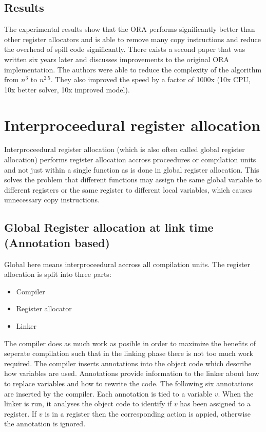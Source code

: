 \documentclass[a4paper,10pt]{article}
\begin{document}
\subsection{Results}
The experimental results show that the ORA performs significantly better than other register allocators and is able to remove many
copy instructions and reduce the overhead of spill code significantly. There exists a second paper that was written six years later and
discusses improvements to the original ORA implementation. The authors were able to reduce the complexity of the algorithm
from $n^3$ to $n^{2.5}$. They also improved the speed by a factor of 1000x (10x CPU, 10x better solver, 10x improved model).


\section{Interproceedural register allocation}
Interproceedural register allocation (which is also often called global register allocation) performs register allocation accross
proceedures or compilation units and not just within a single function as is done in global register allocation. This solves the problem
that different functions may assign the same global variable to different registers or the same register to different local variables,
which causes unnecessary copy instructions.

\subsection{Global Register allocation at link time (Annotation based)}
Global here means interproceedural accross all compilation units. The register allocation is split into three parts:
\begin{itemize}
 \item Compiler
 \item Register allocator
 \item Linker
\end{itemize}
The compiler does as much work as posible in order to maximize the benefits of seperate compilation such that in the linking phase there
is not too much work required. The compiler inserts annotations into the object code which describe how variables are used. Annotations
provide information to the linker about how to replace variables and how to rewrite the code. The following six annotations are inserted
by the compiler. Each annotation is tied to a variable $v$. When the linker is run, it analyses the object code to identify if $v$ has
been assigned to a register. If $v$ is in a register then the corresponding action is appied, otherwise the annotation is ignored.
\end{document}

